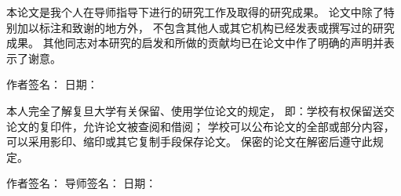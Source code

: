 \documentclass[a4paper,12pt,oneside,CJK]{cctbook}
\theoremstyle{definition}
\numberwithin{equation}{section}
\begin{document}
\newpage
\thispagestyle{empty}


\centerline{}
\vspace{1cm}


\newpage
\thispagestyle{empty}

\centerline{}
\vspace{1cm}

{
本论文是我个人在导师指导下进行的研究工作及取得的研究成果。
论文中除了特别加以标注和致谢的地方外，
不包含其他人或其它机构已经发表或撰写过的研究成果。
其他同志对本研究的启发和所做的贡献均已在论文中作了明确的声明并表示了谢意。
}
\vspace{2cm}

\begin{flushright}
{
作者签名： \underline{\hspace{2cm}} \quad 日期： \underline{\hspace{2cm}}
}
\end{flushright}
\vspace{5cm}

\centerline{}
\vspace{1cm}

{
本人完全了解复旦大学有关保留、使用学位论文的规定，
即：学校有权保留送交论文的复印件，允许论文被查阅和借阅；
学校可以公布论文的全部或部分内容，
可以采用影印、缩印或其它复制手段保存论文。
保密的论文在解密后遵守此规定。
}
\vspace{2cm}

\begin{flushright}
{
作者签名： \underline{\hspace{2cm}} \quad 导师签名： \underline{\hspace{2cm}} 日期： \underline{\hspace{2cm}}
}
\end{flushright}
\end{document}
